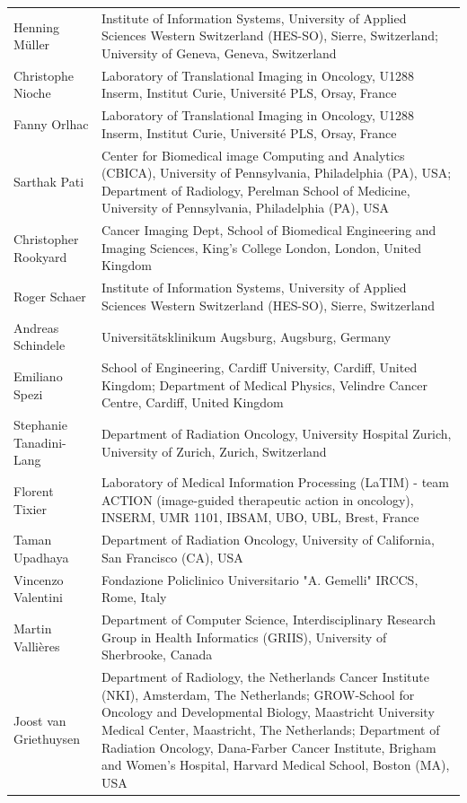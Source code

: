 \documentclass[fleqn,a4paper,oneside,openany]{book}
\begin{document}
\begin{longtable}{p{4cm}p{10cm}}
Henning Müller
& Institute of Information Systems, University of Applied Sciences Western Switzerland (HES-SO), Sierre, Switzerland; University of Geneva, Geneva, Switzerland\\ 
Christophe Nioche
& Laboratory of Translational Imaging in Oncology, U1288 Inserm, Institut Curie, Université PLS, Orsay, France \\ 
Fanny Orlhac
& Laboratory of Translational Imaging in Oncology, U1288 Inserm, Institut Curie, Université PLS, Orsay, France \\ 
Sarthak Pati
& Center for Biomedical image Computing and Analytics (CBICA), University of Pennsylvania, Philadelphia (PA), USA; Department of Radiology, Perelman School of Medicine, University of Pennsylvania, Philadelphia (PA), USA\\ 
Christopher Rookyard
& Cancer Imaging Dept, School of Biomedical Engineering and Imaging Sciences, King’s College London, London, United Kingdom\\
Roger Schaer
& Institute of Information Systems, University of Applied Sciences Western Switzerland (HES-SO), Sierre, Switzerland\\ 
Andreas Schindele
& Universitätsklinikum Augsburg, Augsburg, Germany\\ 
Emiliano Spezi
& School of Engineering, Cardiff University, Cardiff, United Kingdom; Department of Medical Physics, Velindre Cancer Centre, Cardiff, United Kingdom\\ 
Stephanie Tanadini-Lang
& Department of Radiation Oncology, University Hospital Zurich, University of Zurich, Zurich, Switzerland\\ 
Florent Tixier
& Laboratory of Medical Information Processing (LaTIM) - team ACTION (image-guided therapeutic action in oncology), INSERM, UMR 1101, IBSAM, UBO, UBL, Brest, France\\ 
Taman Upadhaya
& Department of Radiation Oncology, University of California, San Francisco (CA), USA\\ 
Vincenzo Valentini
& Fondazione Policlinico Universitario "A. Gemelli" IRCCS, Rome, Italy\\ 
Martin Valli{\`e}res
& Department of Computer Science, Interdisciplinary Research Group in Health Informatics (GRIIS), University of Sherbrooke, Canada\\
Joost van Griethuysen
& Department of Radiology, the Netherlands Cancer Institute (NKI), Amsterdam, The Netherlands; GROW-School for Oncology and Developmental Biology, Maastricht University Medical Center, Maastricht, The Netherlands; Department of Radiation Oncology, Dana-Farber Cancer Institute, Brigham and Women’s Hospital, Harvard Medical School, Boston (MA), USA\\ 

\end{longtable}
\end{document}
